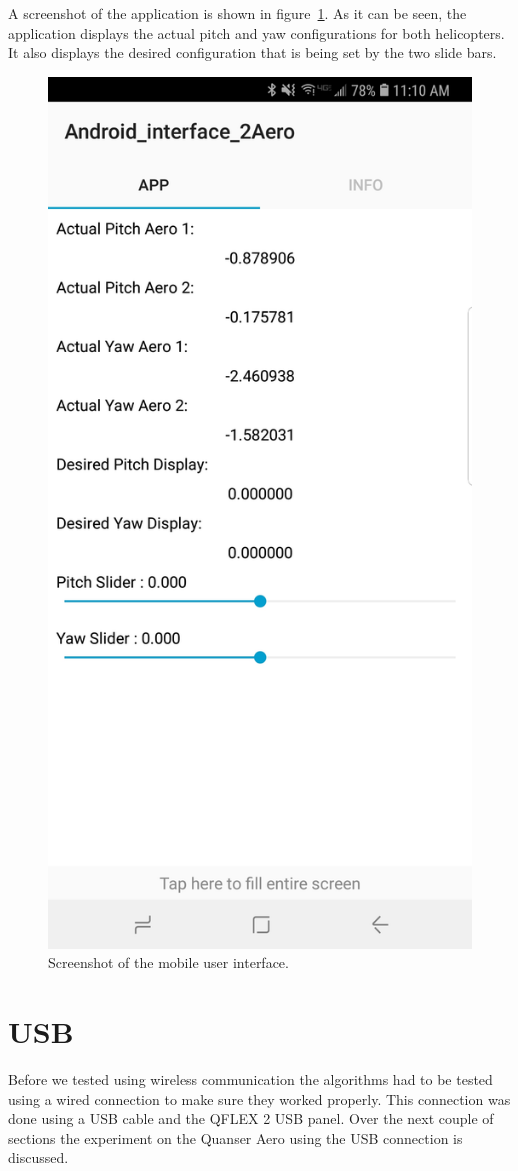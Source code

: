 A screenshot of the application is shown in figure~\ref{fig:Screenshot_Android_Interface}.  As it can be seen, the application displays the actual pitch and yaw configurations for both helicopters.  It also displays the desired configuration that is being set by the two slide bars.
\begin{figure}[!htbp]
    \centering
    \includegraphics[width=.46\textwidth,keepaspectratio=true]{figs/img/Screenshot_Android_Interface_2Aero}
    \caption{Screenshot of the mobile user interface.}
    \label{fig:Screenshot_Android_Interface}
\end{figure}

\section{USB}
Before we tested using wireless communication the algorithms had to be tested using a wired connection to make sure they worked properly.  This connection was done using a USB cable and the QFLEX 2 USB panel.  Over the next couple of sections the experiment on the Quanser Aero using the USB connection is discussed.

